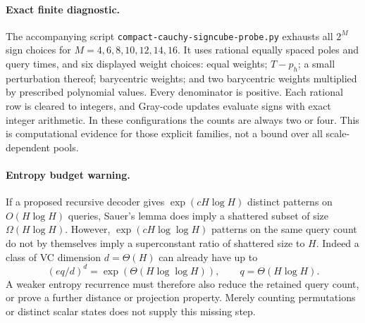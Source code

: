 \documentclass[11pt]{article}
\begin{document}
\paragraph{Exact finite diagnostic.}
The accompanying script \texttt{compact-cauchy-signcube-probe.py}
exhausts all $2^M$ sign choices for $M=4,6,8,10,12,14,16$.
It uses rational equally spaced poles and query times, and six displayed
weight choices: equal weights; $T-p_h$; a small perturbation thereof;
barycentric weights; and two barycentric weights multiplied by prescribed
polynomial values. Every denominator is positive. Each rational row is
cleared to integers, and Gray-code updates evaluate signs with exact
integer arithmetic. In these configurations the counts are always two
or four. This is computational evidence for those explicit families,
not a bound over all scale-dependent pools.

\paragraph{Entropy budget warning.}
If a proposed recursive decoder gives $\exp(cH\log H)$ distinct
patterns on $O(H\log H)$ queries, Sauer's lemma does imply a shattered
subset of size $\Omega(H\log H)$. However,
$\exp(cH\log\log H)$ patterns on the same query count do not by
themselves imply a superconstant ratio of shattered size to $H$.
Indeed a class of VC dimension $d=\Theta(H)$ can already have up to
\[
 (eq/d)^d=\exp(\Theta(H\log\log H)),
 \qquad q=\Theta(H\log H).
\]
A weaker entropy recurrence must therefore also reduce the retained query
count, or prove a further distance or projection property. Merely counting
permutations or distinct scalar states does not supply this missing step.
\end{document}
